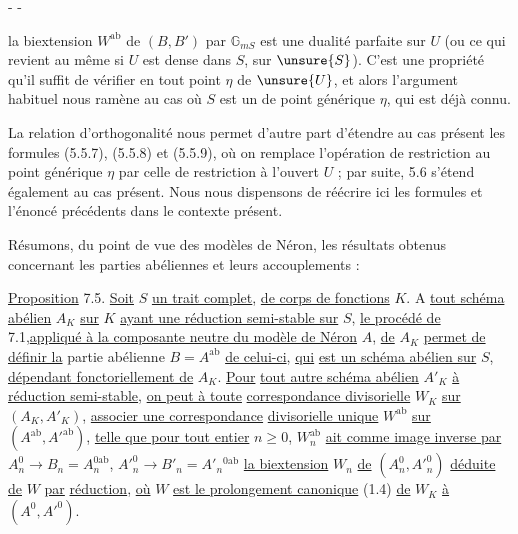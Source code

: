 -  - 

la biextension \(W^{\mathrm{ab}}\) de \((B,B')\) par \(\mathbb G_{mS}\) est une
dualité parfaite sur \(U\) (ou ce qui revient au même si \(U\) est dense dans
\(S\), sur \(\unsure{S}\)). C'est une propriété qu'il suffit de vérifier en tout
point \(\eta\) de \(\unsure{U}\), et alors l'argument habituel nous ramène au cas où
\(S\) est un  de point générique \(\eta\), qui est déjà connu.

La relation d'orthogonalité nous permet d'autre part d'étendre au cas présent
les formules (5.5.7), (5.5.8) et (5.5.9), où on remplace l'opération de restriction
au point générique \(\eta\) par celle de restriction à l'ouvert \(U\) ; par suite,
5.6 s'étend également au cas présent. Nous nous dispensons de réécrire ici les
formules et l'énoncé précédents dans le contexte présent.

Résumons, du point de vue des modèles de Néron, les résultats obtenus concernant
les parties abéliennes et leurs accouplements :

\uline{Proposition} 7.5. \uline{Soit} \(S\) \uline{un trait complet},
\uline{de corps de fonctions} \(K\). A \uline{tout schéma abélien} \(A_K\)
\uline{sur} \(K\) \uline{ayant une réduction semi-stable sur} \(S\),
\uline{le procédé de} 7.1,\uline{appliqué à la composante neutre du modèle de Néron}
\(A\), \uline{de} \(A_K\) \uline{permet de définir la} partie abélienne
\(B=A^{\mathrm{ab}}\) \uline{de celui-ci}, \uline{qui}
\uline{est un schéma abélien sur} \(S\), \uline{dépendant fonctoriellement de}
\(A_K\). \uline{Pour} \uline{tout autre schéma abélien} \(A'_K\)
\uline{à réduction semi-stable}, \uline{on peut à toute}
\uline{correspondance divisorielle} \(W_K\) \uline{sur} \((A_K,A'_K)\),
\uline{associer une correspondance} \uline{divisorielle unique} \(W^{\mathrm{ab}}\)
\uline{sur} \((A^{\mathrm{ab}},A'^{\mathrm{ab}})\),
\uline{telle que pour tout entier} \(n\geq0\), \(W_n^{\mathrm{ab}}\)
\uline{ait comme image inverse par}
\(A_n^0\longrightarrow B_n=A_n^{0\mathrm{ab}}\),
\(A'^0_n\longrightarrow B'_n=A'_n{}^{0\mathrm{ab}}\)
\uline{la biextension} \(W_n\) \uline{de} \((A_n^0,A'^0_n)\)
\uline{déduite de} \(W\) \uline{par} \uline{réduction}, \uline{où} \(W\)
\uline{est le prolongement canonique} (1.4) \uline{de} \(W_K\) \uline{à}
\((A^0,A'^0)\).
